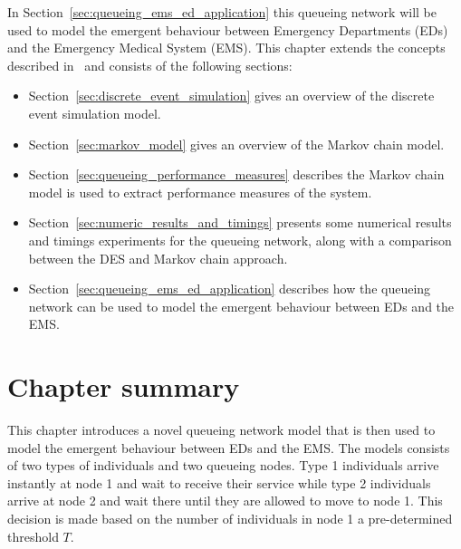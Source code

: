 In Section~\ref{sec:queueing_ems_ed_application} this queueing network will be
used to model the emergent behaviour between
Emergency Departments (EDs) and the Emergency Medical System (EMS).
This chapter extends the concepts described in~\cite{panayides2023game} and
consists of the following sections:

\begin{itemize}
    \item Section~\ref{sec:discrete_event_simulation} gives an overview of
    the discrete event simulation model.
    \item Section~\ref{sec:markov_model} gives an overview of the Markov
    chain model.
    \item Section~\ref{sec:queueing_performance_measures} describes the Markov
    chain model is used to extract performance measures of the system.
    \item Section~\ref{sec:numeric_results_and_timings} presents some numerical
    results and timings experiments for the queueing network, along with
    a comparison between the DES and Markov chain approach.
    \item Section~\ref{sec:queueing_ems_ed_application} describes how the
    queueing network can be used to model the emergent behaviour between
    EDs and the EMS.
\end{itemize}















\section{Chapter summary}

This chapter introduces a novel queueing network model that is then used to
model the emergent behaviour between EDs and the EMS.
The models consists of two types of individuals and two queueing nodes.
Type 1 individuals arrive instantly at node 1 and wait to receive their
service while type 2 individuals arrive at node 2 and wait there until they
are allowed to move to node 1.
This decision is made based on the number of individuals in node 1 a
pre-determined threshold \(T\).


